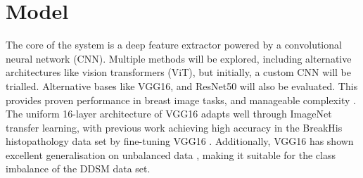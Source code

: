\documentclass[../main]{subfiles}
\begin{document}
\section{Model}
The core of the system is a deep feature extractor powered by a convolutional neural network (CNN). Multiple methods will be explored, including alternative architectures like vision transformers (ViT), but initially, a custom CNN will be trialled. Alternative bases like VGG16, and ResNet50 will also be evaluated. This provides proven performance in breast image tasks, and manageable complexity \autocite{fatima2025application}. The uniform 16-layer architecture of VGG16 adapts well through ImageNet transfer learning, with previous work achieving high accuracy in the BreakHis histopathology data set by fine-tuning VGG16 \autocite{fatima2025application}. Additionally, VGG16 has shown excellent generalisation on unbalanced data \autocite{fatima2025application}, making it suitable for the class imbalance of the DDSM data set.
\end{document}
